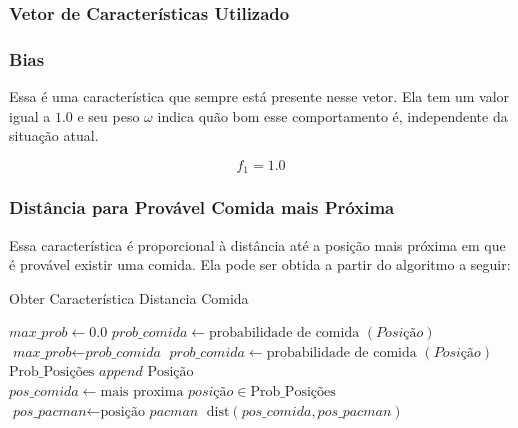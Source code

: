 \subsubsection{Vetor de Características Utilizado}

\subsubsection*{Bias}

Essa é uma característica que sempre está presente nesse vetor. Ela tem um valor igual a $ 1.0 $ e seu peso $ \omega $ indica quão bom esse comportamento é, independente da situação atual.

$$ f_1 = 1.0 $$

\subsubsection*{Distância para Provável Comida mais Próxima} \label{subsubsection:DistProvavelComida}

Essa característica é proporcional à distância até a posição mais próxima em que é provável existir uma comida. Ela pode ser obtida a partir do algoritmo a seguir:

\begin{algorithm}[H]
	\caption{Obter Característica Distancia Comida} \label{algorithm:ObterCaracteristicaDistanciaComida}
	\begin{algorithmic}[1]
			\State $\textit{max\_prob} \gets 0.0 $
				\State $\textit{prob\_comida} \gets \text{probabilidade de comida } \left( \textit{Posição} \right) $
					\State $\textit{max\_prob} \gets \textit{prob\_comida} $
				\EndIf 
			\EndFor
				\State $\textit{prob\_comida} \gets \text{probabilidade de comida } \left( \textit{Posição} \right) $
					\State $ \text{Prob\_Posições } append \text{ Posição} $
				\EndIf 
			\EndFor
			\State $\textit{pos\_comida} \gets \text{mais proxima }\textit{posição} \in \text{Prob\_Posições} $
			\State $\textit{pos\_pacman} \gets \text{posição }\textit{pacman} $
			\State \Return $ \text{dist} \left( \textit{pos\_comida}, \textit{pos\_pacman} \right)  $
		\EndProcedure
	\end{algorithmic}
\end{algorithm}

